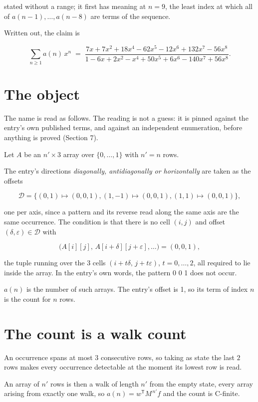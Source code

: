 \documentclass[11pt]{article}
\theoremstyle{definition}
\begin{document}
stated without a range; it first has meaning at $n = 9$, the least index at which all of $a(n-1),\dots,a(n-8)$ are terms of the sequence.

Written out, the claim is

\[\sum_{n \ge 1} a(n)\,x^n \;=\; \frac{7x + 7x^{2} + 18x^{4} - 62x^{5} - 12x^{6} + 132x^{7} - 56x^{8}}{1 - 6x + 2x^{2} - x^{4} + 50x^{5} + 6x^{6} - 140x^{7} + 56x^{8}}.\]

\section{The object}

The name is read as follows. The reading is not a guess: it is pinned against the entry's own published terms, and against an independent enumeration, before anything is proved (Section 7).

Let $A$ be an $n' \times 3$ array over $\{0,\dots,1\}$ with $n' = n$ rows.

The entry's directions {\itshape diagonally, antidiagonally or horizontally} are taken as the offsets

\[\mathcal{D} = \{(0,1)\mapsto(0,0,1), (1,-1)\mapsto(0,0,1), (1,1)\mapsto(0,0,1)\},\]

one per axis, since a pattern and its reverse read along the same axis are the same occurrence. The condition is that there is no cell $(i,j)$ and offset $(\delta,\varepsilon)\in\mathcal{D}$ with

\[\bigl(A[i][j],\,A[i{+}\delta][j{+}\varepsilon],\dots\bigr) = (0, 0, 1),\]

the tuple running over the $3$ cells $(i+t\delta,\,j+t\varepsilon)$, $t = 0,\dots,2$, all required to lie inside the array. In the entry's own words, the pattern 0 0 1 does not occur.

$a(n)$ is the number of such arrays. The entry's offset is 1, so its term of index $n$ is the count for $n$ rows.

\section{The count is a walk count}

An occurrence spans at most $3$ consecutive rows, so taking as state the last $2$ rows makes every occurrence detectable at the moment its lowest row is read.

An array of $n'$ rows is then a walk of length $n'$ from the empty state, every array arising from exactly one walk, so $a(n) = w^{\mathsf T}M^{\,n'}f$ and the count is C-finite.
\end{document}

